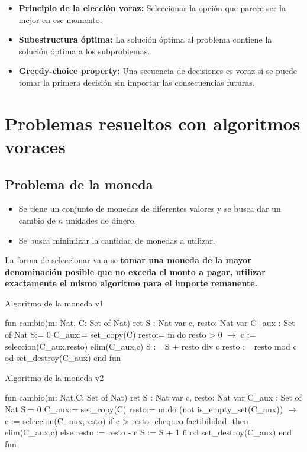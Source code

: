 \begin{itemize}
    \item \textbf{Principio de la elección voraz:} Seleccionar la opción que parece ser la mejor en ese momento.
    \item \textbf{Subestructura óptima:} La solución óptima al problema contiene la solución óptima a los subproblemas.
    \item \textbf{Greedy-choice property:} Una secuencia de decisiones es voraz si se puede tomar la primera decisión sin importar las consecuencias futuras.
\end{itemize}

\section{Problemas resueltos con algoritmos voraces}

\subsection{Problema de la moneda}

\begin{itemize}
    \item Se tiene un conjunto de monedas de diferentes valores y se busca dar un cambio de $n$ unidades de dinero.
    \item Se busca minimizar la cantidad de monedas a utilizar.
\end{itemize}

La forma de seleccionar va a se \textbf{tomar una moneda de la mayor denominación posible que no exceda el monto a pagar, utilizar exactamente el mismo algoritmo para el importe remanente.}

\begin{codebox}{Algoritmo de la moneda v1}
\begin{pascallike}
fun cambio(m: Nat, C: Set of Nat) ret S : Nat
    var c, resto: Nat
    var C_aux : Set of Nat
    S:= 0
    C_aux:= set_copy(C)
    resto:= m
    do resto > 0 $\rightarrow$
        c := seleccion(C_aux,resto)
        elim(C_aux,c)
        S := S + resto div c
        resto := resto mod c
    od
    set_destroy(C_aux)
end fun
\end{pascallike}
\end{codebox}

\begin{codebox}{Algoritmo de la moneda v2}
\begin{pascallike}
fun cambio(m: Nat,C: Set of Nat) ret S : Nat
    var c, resto: Nat
    var C_aux : Set of Nat
    S:= 0
    C_aux:= set_copy(C)
    resto:= m
    do (not is_empty_set(C_aux)) $\rightarrow$
        c := seleccion(C_aux,resto)
        if c > resto {-chequeo factibilidad-}
            then elim(C_aux,c)
            else resto := resto - c
            S := S + 1 
        fi
    od
    set_destroy(C_aux)
end fun
\end{pascallike}
\end{codebox}


